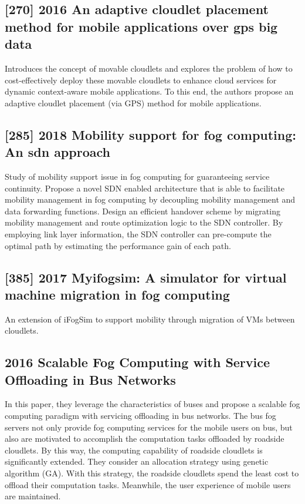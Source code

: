 \subsection{[270] 2016 An adaptive cloudlet placement method for mobile applications over gps big data}
\label{subsec:paper19} \cite{xiang2016adaptive}
Introduces the concept of movable cloudlets and explores the problem of how to cost-effectively deploy these movable cloudlets to enhance cloud services for dynamic context-aware mobile applications. To this end, the authors propose an adaptive cloudlet placement (via GPS) method for mobile applications.

\subsection{[285] 2018 Mobility support for fog computing: An sdn approach}
\label{subsec:paper20} \cite{bi2018mobility}
Study of mobility support issue in fog computing for guaranteeing service continuity. Propose a novel SDN enabled architecture that is able to facilitate mobility management in fog computing by decoupling mobility management and data forwarding functions. Design an efficient handover scheme by migrating mobility management and route optimization logic to the SDN controller. By employing link layer information, the SDN controller can pre-compute the optimal path by estimating the performance gain of each path.

\subsection{[385] 2017 Myifogsim: A simulator for virtual machine migration in fog computing}
\label{subsec:paper21} \cite{lopes2017myifogsim}
An extension of iFogSim to support mobility through migration of VMs between cloudlets.

\subsection{2016 Scalable Fog Computing with Service Offloading in Bus Networks}
\label{subsec:paper22} \cite{ye2016scalable}
In this paper, they leverage the characteristics of buses and propose a scalable fog computing paradigm with servicing offloading in bus networks. The bus fog servers not only provide fog computing services for the mobile users on bus, but also are motivated to accomplish the computation tasks offloaded by roadside cloudlets. By this way, the computing capability of roadside cloudlets is significantly extended. They consider an allocation strategy using genetic algorithm (GA). With this strategy, the roadside cloudlets spend the least cost to offload their computation tasks. Meanwhile, the user experience of mobile users are maintained.

